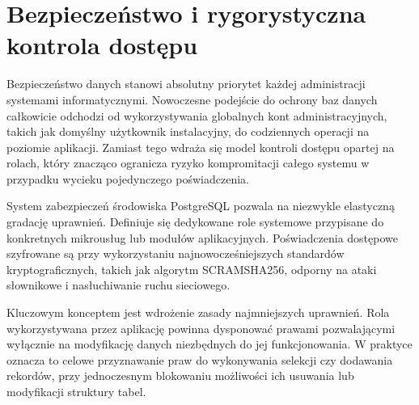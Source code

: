 \documentclass[letterpaper,10pt,english]{sphinxmanual}
\begin{document}
\begin{sphinxVerbatim}[commandchars=\\\{\}]
\end{sphinxVerbatim}


\section{Bezpieczeństwo i rygorystyczna kontrola dostępu}
\label{\detokenize{rozdzial_1/index:bezpieczenstwo-i-rygorystyczna-kontrola-dostepu}}
\sphinxAtStartPar
Bezpieczeństwo danych stanowi absolutny priorytet każdej administracji systemami informatycznymi. Nowoczesne podejście do ochrony baz danych całkowicie odchodzi od wykorzystywania globalnych kont administracyjnych, takich jak domyślny użytkownik instalacyjny, do codziennych operacji na poziomie aplikacji. Zamiast tego wdraża się model kontroli dostępu opartej na rolach, który znacząco ogranicza ryzyko kompromitacji całego systemu w przypadku wycieku pojedynczego poświadczenia.

\sphinxAtStartPar
System zabezpieczeń środowiska PostgreSQL pozwala na niezwykle elastyczną gradację uprawnień. Definiuje się dedykowane role systemowe przypisane do konkretnych mikrousług lub modułów aplikacyjnych. Poświadczenia dostępowe szyfrowane są przy wykorzystaniu najnowocześniejszych standardów kryptograficznych, takich jak algorytm SCRAM\sphinxhyphen{}SHA\sphinxhyphen{}256, odporny na ataki słownikowe i nasłuchiwanie ruchu sieciowego.

\sphinxAtStartPar
Kluczowym konceptem jest wdrożenie zasady najmniejszych uprawnień. Rola wykorzystywana przez aplikację powinna dysponować prawami pozwalającymi wyłącznie na modyfikację danych niezbędnych do jej funkcjonowania. W praktyce oznacza to celowe przyznawanie praw do wykonywania selekcji czy dodawania rekordów, przy jednoczesnym blokowaniu możliwości ich usuwania lub modyfikacji struktury tabel.
\end{document}
